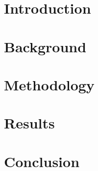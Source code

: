 \documentclass[12pt]{article}
\begin{document}
\newpage

\tableofcontents
\newpage

\section{Introduction}

\cite{sumpterFittingXGModel}

\section{Background}
\section{Methodology}
\section{Results}
\section{Conclusion}



\end{document}
